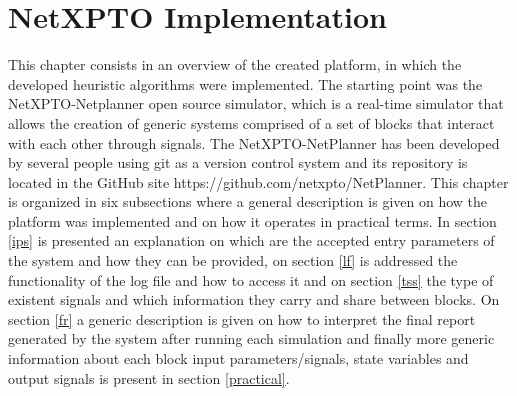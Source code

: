 \chapter{NetXPTO Implementation}
\label{chapter4}


This chapter consists in an overview of the created platform, in which the developed heuristic algorithms were implemented. The starting point was the NetXPTO-Netplanner open source simulator, which is a real-time simulator that allows the creation of generic systems comprised of a set of blocks that interact with each other through signals. The NetXPTO-NetPlanner has been developed by several people using git as a version control system and its repository is located in the GitHub site https://github.com/netxpto/NetPlanner. This chapter is organized in six subsections where a general description is given on how the platform was implemented and on how it operates in practical terms. In section \ref{ips} is presented an explanation on which are the accepted entry parameters of the system and how they can be provided, on section \ref{lf} is addressed the functionality of the log file and how to access it and on section \ref{tss} the type of existent signals and which information they carry and share between blocks. On section \ref{fr} a generic description is given on how to interpret the final report generated by the system after running each simulation and finally more generic information about each block input parameters/signals, state variables and output signals is present in section \ref{practical}.  



